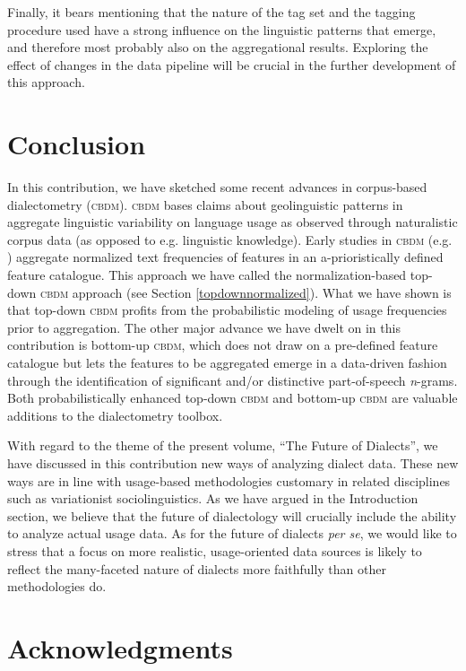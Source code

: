 \documentclass[output=paper]{LSP/langsci}
\begin{document}
Finally, it bears mentioning that the nature of the tag set and the tagging procedure used have a strong influence on the linguistic patterns that emerge, and therefore most probably also on the aggregational results.
Exploring the effect of changes in the data pipeline will be crucial in the further development of this approach.

\section{Conclusion} \label{conclusion}

In this contribution, we have sketched some recent advances in corpus-based dialectometry (\textsc{cbdm}).
\textsc{cbdm} bases claims about geolinguistic patterns in aggregate linguistic variability on language usage as observed through naturalistic corpus data (as opposed to e.g. linguistic knowledge).
Early studies in \textsc{cbdm} (e.g. \citealt{szmrecsanyi_corpus-based_2011}) aggregate normalized text frequencies of features in an a-prioristically defined feature catalogue.
This approach we have called the normalization-based top-down \textsc{cbdm} approach (see Section \ref{topdownnormalized}).
What we have shown is that top-down \textsc{cbdm} profits from the probabilistic modeling of usage frequencies prior to aggregation.
The other major advance we have dwelt on in this contribution is bottom-up \textsc{cbdm}, which does not draw on a pre-defined feature catalogue but lets the features to be aggregated emerge in a data-driven fashion through the identification of significant and/or distinctive part-of-speech \emph{n}-grams.
Both probabilistically enhanced top-down \textsc{cbdm} and bottom-up \textsc{cbdm} are valuable additions to the dialectometry toolbox.

With regard to the theme of the present volume, ``The Future of Dialects'', we have discussed in this contribution new ways of analyzing dialect data.
These new ways are in line with usage-based methodologies customary in related disciplines such as variationist sociolinguistics. 
As we have argued in the Introduction section, we believe that the future of dialectology will crucially include the ability to analyze actual usage data. 
As for the future of dialects \textit{per se}, we would like to stress that a focus on more realistic, usage-oriented data sources is likely to reflect the many-faceted nature of dialects more faithfully than other methodologies do. 

\section*{Acknowledgments}
\end{document}
